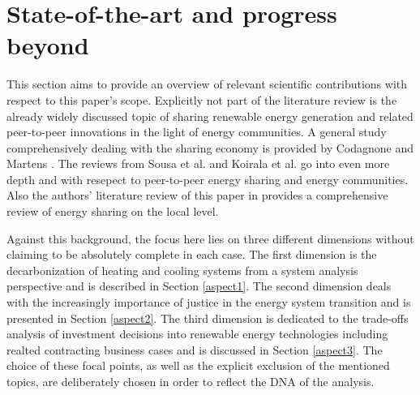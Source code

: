 \section{State-of-the-art and progress beyond}\label{stateoftheart}
This section aims to provide an overview of relevant scientific contributions with respect to this paper's scope. Explicitly not part of the literature review is the already widely discussed topic of sharing renewable energy generation and related peer-to-peer innovations in the light of energy communities. A general study comprehensively dealing with the sharing economy is provided by Codagnone and Martens \cite{codagnone2016scoping}. The reviews from Sousa et al. \cite{sousa2019peer} and Koirala et al. \cite{koirala2016energetic} go into even more depth and with resepect to peer-to-peer energy sharing and energy communities. Also the authors' literature review of this paper in \cite{zwickl2021open} provides a comprehensive review of energy sharing on the local level.\vspace{0.5cm}

Against this background, the focus here lies on three different dimensions without claiming to be absolutely complete in each case. The first dimension is the decarbonization of heating and cooling systems from a system analysis perspective and is described in Section \ref{aspect1}. The second dimension deals with the increasingly importance of justice in the energy system transition and is presented in Section \ref{aspect2}. The third dimension is dedicated to the trade-offs analysis of investment decisions into renewable energy technologies including realted contracting business cases and is discussed in Section \ref{aspect3}. The choice of these focal points, as well as the explicit exclusion of the mentioned topics, are deliberately chosen in order to reflect the DNA of the analysis. 

